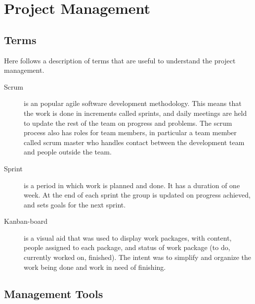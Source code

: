 \chapter{Project Management}
\section{Terms}
Here follows a description of terms that are useful to understand the project management. 

\begin{description}
\item[Scrum] \label{def:scrum}is an popular agile software development methodology. This means that the work is done in increments called sprints, and daily meetings are held to update the rest of the team on progress and problems. The scrum process also has roles for team members, in particular a team member called scrum master who handles contact between the development team and people outside the team.

\item[Sprint] \label{def:sprint} is a period in which work is planned and done. It has a duration of one week. At the end of each sprint the group is updated on progress achieved, and sets goals for the next sprint. 
\item[Kanban-board] \label{def:kanban} is a visual aid that was used to display work packages, with content, people assigned to each package, and status of work package (to do, currently worked on, finished). The intent was to simplify and organize the work being done and work in need of finishing.
\end{description}

\section{Management Tools}
 
